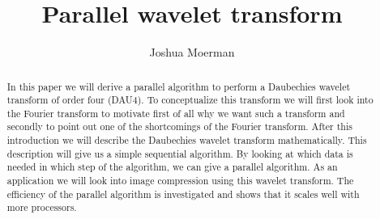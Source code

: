 \documentclass[a4paper, 11pt]{amsart}
\title{Parallel wavelet transform}
\author{Joshua Moerman}
\begin{document}
\begin{abstract}
In this paper we will derive a parallel algorithm to perform a Daubechies wavelet transform of order four (DAU4). To conceptualize this transform we will first look into the Fourier transform to motivate first of all why we want such a transform and secondly to point out one of the shortcomings of the Fourier transform. After this introduction we will describe the Daubechies wavelet transform mathematically. This  description will give us a simple sequential algorithm. By looking at which data is needed in which step of the algorithm, we can give a parallel algorithm. As an application we will look into image compression using this wavelet transform. The efficiency of the parallel algorithm is investigated and shows that it scales well with more processors.
\end{abstract}

\maketitle
\tableofcontents










\nocite{*}

{}
\end{document}
